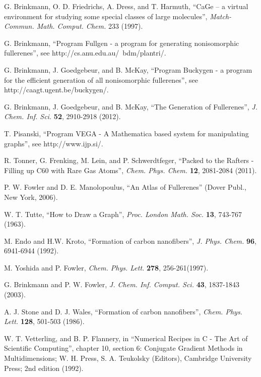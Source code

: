 \documentclass[article,a4paper,twoside]{memoir}
\begin{document}
\begin{thebibliography}{99}

 G. Brinkmann, O. D. Friedrichs, A. Dress, and T. Harmuth, ``CaGe -- a virtual environment for studying some special classes of large molecules'', \textit{Match-Commun. Math. Comput. Chem.} 233 (1997).
 
 G. Brinkmann, ``Program Fullgen - a program for generating nonisomorphic fullerenes'', see http://cs.anu.edu.au/~bdm/plantri/.
 
 G. Brinkmann, J. Goedgebeur, and B. McKay, ``Program Buckygen - a program for the efficient generation of all nonisomorphic fullerenes'',
see http://caagt.ugent.be/buckygen/.

 G. Brinkmann, J. Goedgebeur, and B. McKay, ``The Generation of Fullerenes'', \textit{J. Chem. Inf. Sci.} \textbf{52}, 2910-2918 (2012). 

 T. Pisanski, ``Program VEGA - A Mathematica based system for manipulating graphs'', see http://www.ijp.si/.

 R. Tonner, G. Frenking, M. Lein, and P. Schwerdtfeger, ``Packed to the Rafters - Filling up C60 with Rare Gas Atoms'', 
\textit{Chem. Phys. Chem.} \textbf{12}, 2081-2084 (2011).

 P. W. Fowler and D. E. Manolopoulus, ``An Atlas of Fullerenes'' (Dover Publ., New York, 2006).
 
 W. T. Tutte, ``How to Draw a Graph'', \textit{Proc. London Math. Soc.} \textbf{13}, 743-767 (1963).

 M. Endo and H.W. Kroto, ``Formation of carbon nanofibers'', \textit{J. Phys. Chem.} \textbf{96}, 6941-6944 (1992).

 M. Yoshida and P. Fowler, \textit{Chem. Phys. Lett.} \textbf{278}, 256-261(1997).

 G. Brinkmann and P. W. Fowler, \textit{J. Chem. Inf. Comput. Sci.} \textbf{43}, 1837-1843 (2003).

 A. J. Stone and D. J. Wales, ``Formation of carbon nanofibers'', \textit{Chem. Phys. Lett.} \textbf{128}, 501-503 (1986).

 W. T. Vetterling, and B. P. Flannery, in ``Numerical Recipes in C - The Art of Scientific Computing'', chapter 10, section 6: Conjugate Gradient Methods in Multidimensions; W. H. Press, S. A. Teukolsky (Editors), Cambridge University Press; 2nd edition (1992).


\end{thebibliography}
\end{document}
